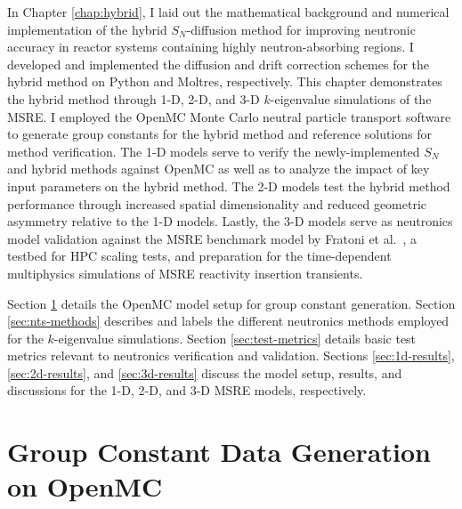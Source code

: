 In Chapter \ref{chap:hybrid}, I laid out the mathematical background and numerical implementation
of the hybrid $S_N$-diffusion method for improving neutronic accuracy in reactor systems containing
highly neutron-absorbing regions. I developed and implemented the diffusion and drift correction
schemes for the hybrid method on Python and Moltres, respectively. This chapter demonstrates
the hybrid method through 1-D, 2-D, and 3-D $k$-eigenvalue simulations of the \gls{MSRE}.
I employed the OpenMC Monte Carlo neutral particle transport software \cite{romano_openmc:_2015} to
generate group constants for the hybrid method and reference solutions for method verification.
The 1-D models serve to verify the newly-implemented $S_N$ and hybrid methods
against OpenMC as well as to analyze the impact of key input parameters on the hybrid method. The
2-D models test the hybrid method performance through increased spatial dimensionality and reduced
geometric asymmetry relative to the 1-D models. Lastly, the 3-D models serve as neutronics model
validation against the \gls{MSRE} benchmark model by Fratoni et al.\ \cite{fratoni_molten_2020}, a
testbed for \gls{HPC} scaling tests, and preparation for the time-dependent multiphysics
simulations of \gls{MSRE} reactivity insertion transients.

Section \ref{sec:msre-gc} details the OpenMC model setup for group constant generation. Section
\ref{sec:nts-methods} describes and labels the different neutronics methods employed for the
$k$-eigenvalue simulations. Section \ref{sec:test-metrics} details basic test metrics relevant to
neutronics verification and validation. Sections \ref{sec:1d-results}, \ref{sec:2d-results}, and
\ref{sec:3d-results} discuss the model setup, results, and discussions for the 1-D, 2-D, and 3-D
\gls{MSRE} models, respectively.

\section{Group Constant Data Generation on OpenMC} \label{sec:msre-gc}

